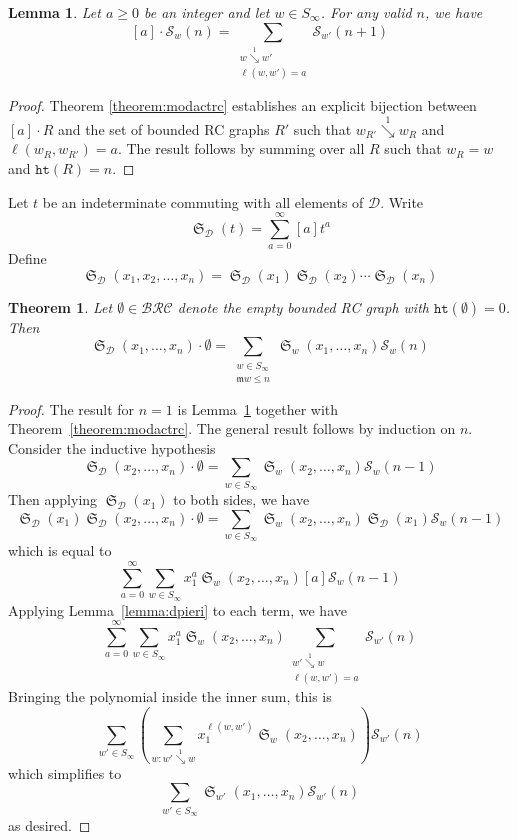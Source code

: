 \documentclass{amsart}
\newtheorem{lemma}{Lemma}[subsection]
\newtheorem{theorem}{Theorem}[section]
\theoremstyle{definition}
\theoremstyle{remark}
\numberwithin{equation}{subsection}
\DeclareMathOperator{\sch}{\mathfrak{S}}
\newcommand{\downvar}[1]{\stackrel{#1}{\searrow}}
\newcommand{\wof}[1]{w_{#1}}
\newcommand{\hr}{\mathtt{ht}}
\newcommand{\BRC}{\mathcal{BRC}}
\newcommand{\dcoma}{\mathcal{D}}
\newcommand{\maxd}{\mathfrak{m}}
\begin{document}
\begin{lemma} \label{lemma:drcpieri}
	Let $a\geq 0$ be an integer and let $w\in S_\infty$. For any valid $n$, we have
	$$[a]\cdot \mathcal{S}_w(n) = \sum_{\substack{w\downvar{1} w'\\\ell(w,w')=a}} \mathcal{S}_{w'}(n+1)$$
\end{lemma}
\begin{proof}
Theorem \ref{theorem:modactrc} establishes an explicit bijection between $[a]\cdot R$ and the set of bounded RC graphs $R'$ such that $\wof{R'}\downvar{1}\wof{R}$ and $\ell(\wof{R},\wof{R'})=a$. The result follows by summing over all $R$ such that $\wof{R}=w$ and $\hr(R)=n$.
\end{proof}

Let $t$ be an indeterminate commuting with all elements of $\dcoma$. Write
$$\sch_\dcoma(t) = \sum_{a=0}^\infty [a]t^a$$
Define
$$\sch_\dcoma(x_1,x_2,\ldots,x_n) = \sch_\dcoma(x_1)\sch_\dcoma(x_2)\cdots \sch_\dcoma(x_n)$$

\begin{theorem}
	Let $\emptyset\in \BRC$ denote the empty bounded RC graph with $\hr(\emptyset)=0$. Then
  $$\sch_\dcoma(x_1,\ldots,x_n)\cdot \emptyset=\sum_{\substack{w\in S_\infty\\ \maxd{w}\leq n}}\sch_w(x_1,\ldots,x_n)\mathcal{S}_w(n)$$
\end{theorem}
\begin{proof}
	The result for $n=1$ is Lemma~\ref{lemma:drcpieri} together with Theorem~\ref{theorem:modactrc}. The general result follows by induction on $n$. Consider the inductive hypothesis
	$$\sch_\dcoma(x_2,\ldots,x_n)\cdot \emptyset=\sum_{w\in S_\infty}\sch_w(x_2,\ldots,x_n)\mathcal{S}_w(n-1)$$
	Then applying $\sch_\dcoma(x_1)$ to both sides, we have
	$$\sch_\dcoma(x_1)\sch_\dcoma(x_2,\ldots,x_n)\cdot \emptyset=\sum_{w\in S_\infty}\sch_w(x_2,\ldots,x_n)\sch_\dcoma(x_1)\mathcal{S}_w(n-1)$$
	which is equal to
	$$\sum_{a=0}^\infty\sum_{w\in S_\infty}x_1^a\sch_w(x_2,\ldots,x_n)[a]\mathcal{S}_w(n-1)$$
	Applying Lemma~\ref{lemma:dpieri} to each term, we have
	$$\sum_{a=0}^\infty\sum_{w\in S_\infty}x_1^a\sch_w(x_2,\ldots,x_n)\sum_{\substack{w'\downvar{1} w\\\ell(w,w')=a}} \mathcal{S}_{w'}(n)$$
	Bringing the polynomial inside the inner sum, this is
	$$\sum_{w'\in S_\infty}\left(\sum_{w:w'\downvar{1}w} x_1^{\ell(w,w')}\sch_w(x_2,\ldots,x_n)\right)\mathcal{S}_{w'}(n)$$
	which simplifies to
	$$\sum_{w'\in S_\infty}\sch_{w'}(x_1,\ldots,x_n)\mathcal{S}_{w'}(n)$$
	as desired.
\end{proof}
\end{document}
